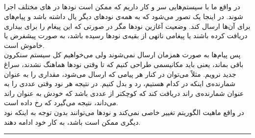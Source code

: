 \documentclass{article}
\begin{document}
\begin{multicols}{2}
\subsection{}
در واقع ما با سیستم‌هایی سر و کار داریم که ممکن است نودها در 
های مختلف اجرا شوند. در اینجا یک 
تصور می‌شود که به همه‌ی نودهای دیگر یال داشته باشد و پیام‌های
برای آن‌ها ارسال کند. وضعیت آغازین نودها مگر در صورتی که این پیغام را برای بیداری دریافت کرده باشند یا پیغامی ناتهی از بقیه‌ی نودها رسیده باشد، به صورت پیشفرض 
یا خاموش است.\\
پس پیام‌ها به صورت همزمان ارسال نمی‌شوند ولی می‌خواهیم کل سیستم سنکرون باقی بماند، یعنی باید مکانیسمی طراحی کنیم که تا وقتی نودها هماهنگ نشدند، سراغ
جدید نرویم. مثلاً می‌توان در کنار هر پیامی که ارسال می‌شود، مقداری را به عنوان شمارنده‌ی اینکه در کدام
هستیم، رد و بدل کنیم. در نتیجه هر نود وقتی عددی را به عنوان شمارنده‌ی راند دریافت کند که کوچکتر از عددی باشد که خودش به عنوان راند می‌داند، نتیجه می‌گیرد که 
رخ داده است.\\
در واقع ماهیت الگوریتم تغییر خاصی نمی‌کند و نودها می‌توانند بدون توجه به اینکه نود دیگری ممکن است
باشد، به کار خود ادامه دهند.\\
\rule{\linewidth}{1pt}



\end{multicols}
\end{document}
